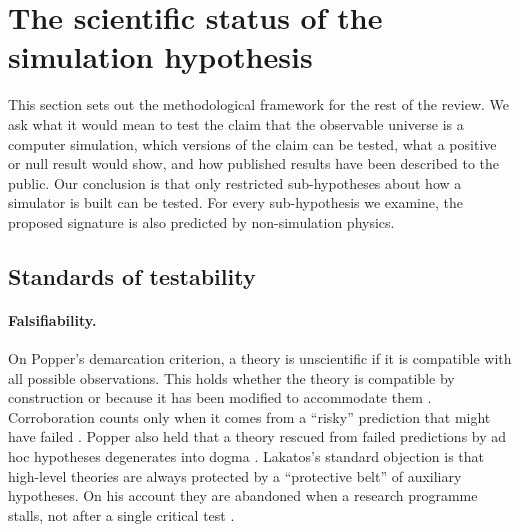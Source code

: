 
\section{The scientific status of the simulation hypothesis}
\label{sec:methodology}

This section sets out the methodological framework for the rest of the review.
We ask what it would mean to test the claim that the observable universe is a
computer simulation, which versions of the claim can be tested, what a
positive or null result would show, and how published results have been
described to the public. Our conclusion is that only restricted
sub-hypotheses about how a simulator is built can be tested. For every
sub-hypothesis we examine, the proposed signature is also predicted by
non-simulation physics.

\subsection{Standards of testability}
\label{sec:methodology:standards}

\paragraph{Falsifiability.}
On Popper's demarcation criterion, a theory is unscientific if it is
compatible with all possible observations. This holds whether the theory is
compatible by construction or because it has been modified to accommodate them
\cite{Thornton2026karl}. Corroboration counts only when it comes from a
``risky'' prediction that might have failed \cite{Thornton2026karl}. Popper
also held that a theory rescued from failed predictions by ad hoc hypotheses
degenerates into dogma \cite{Thornton2026karl}. Lakatos's standard objection is
that high-level theories are always protected by a ``protective belt'' of
auxiliary hypotheses. On his account they are abandoned when a research
programme stalls, not after a single critical test \cite{Thornton2026karl}.


